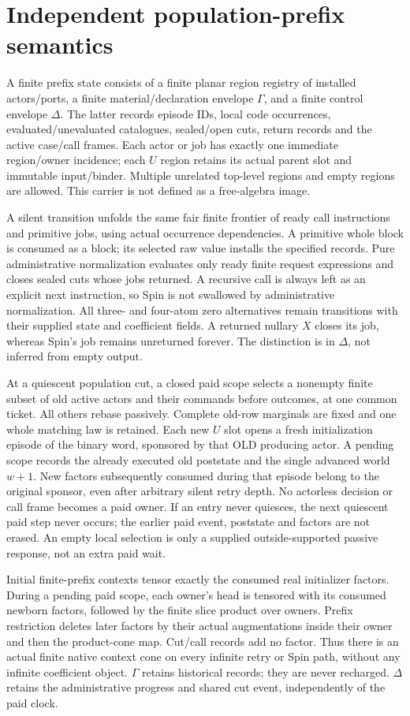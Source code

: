 \documentclass{article}
\begin{document}
\section{Independent population-prefix semantics}
A finite prefix state consists of a finite planar region registry of installed actors/ports, a finite material/declaration envelope $\Gamma$, and a finite control envelope $\Delta$. The latter records episode IDs, local code occurrences, evaluated/unevaluated catalogues, sealed/open cuts, return records and the active case/call frames. Each actor or job has exactly one immediate region/owner incidence; each $U$ region retains its actual parent slot and immutable input/binder. Multiple unrelated top-level regions and empty regions are allowed. This carrier is not defined as a free-algebra image.

A silent transition unfolds the same fair finite frontier of ready call instructions and primitive jobs, using actual occurrence dependencies. A primitive whole block is consumed as a block; its selected raw value installs the specified records. Pure administrative normalization evaluates only ready finite request expressions and closes sealed cuts whose jobs returned. A recursive call is always left as an explicit next instruction, so Spin is not swallowed by administrative normalization. All three- and four-atom zero alternatives remain transitions with their supplied state and coefficient fields. A returned nullary $X$ closes its job, whereas Spin's job remains unreturned forever. The distinction is in $\Delta$, not inferred from empty output.

At a quiescent population cut, a closed paid scope selects a nonempty finite subset of old active actors and their commands before outcomes, at one common ticket. All others rebase passively. Complete old-row marginals are fixed and one whole matching law is retained. Each new $U$ slot opens a fresh initialization episode of the binary word, sponsored by that OLD producing actor. A pending scope records the already executed old poststate and the single advanced world $w+1$. New factors subsequently consumed during that episode belong to the original sponsor, even after arbitrary silent retry depth. No actorless decision or call frame becomes a paid owner. If an entry never quiesces, the next quiescent paid step never occurs; the earlier paid event, poststate and factors are not erased. An empty local selection is only a supplied outside-supported passive response, not an extra paid wait.

Initial finite-prefix contexts tensor exactly the consumed real initializer factors. During a pending paid scope, each owner's head is tensored with its consumed newborn factors, followed by the finite slice product over owners. Prefix restriction deletes later factors by their actual augmentations inside their owner and then the product-cone map. Cut/call records add no factor. Thus there is an actual finite native context cone on every infinite retry or Spin path, without any infinite coefficient object. $\Gamma$ retains historical records; they are never recharged. $\Delta$ retains the administrative progress and shared cut event, independently of the paid clock.
\end{document}
